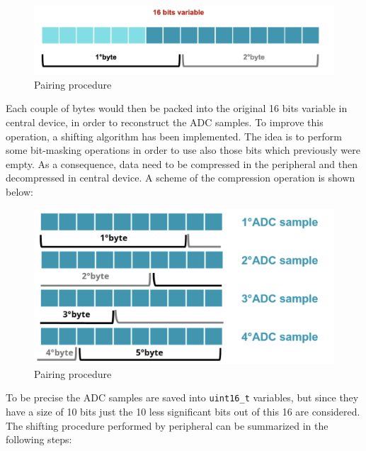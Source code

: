 \documentclass{Configuration_Files/PoliMi3i_thesis}
\begin{document}
\begin{figure}[H]
    \centering
    \includegraphics[scale=0.7]{Shift Algorithm/Screenshot 2024-07-22 at 22.31.29.png}
    \caption{Pairing procedure}
    \label{pairing_procedure_3}
\end{figure}


Each couple of bytes would then be packed into the original 16 bits variable in central device, in order to reconstruct the ADC samples. To improve this operation, a shifting algorithm has been implemented. The idea is to perform some bit-masking operations in order to use also those bits which previously were empty. As a consequence, data need to be compressed in the peripheral and then decompressed in central device. A scheme of the compression operation is shown below:

\begin{figure}[H]
    \centering
    \includegraphics[scale=0.7]{Shift Algorithm/Screenshot 2024-07-22 at 22.31.36.png}
    \caption{Pairing procedure}
    \label{pairing_procedure_4}
\end{figure}

To be precise the ADC samples are saved into \texttt{uint16\_t} variables, but since they have a size of 10 bits just the 10 less significant bits out of this 16 are considered. The shifting procedure performed by peripheral can be summarized in the following steps:
\end{document}
